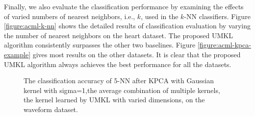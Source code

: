 Finally, we also evaluate the classification performance by examining the effects of varied numbers of nearest neighbors, i.e., $k$, used in the $k$-NN classifiers. Figure \ref{figure:acml-k-nn} shows the detailed results of classification evaluation by varying the number of nearest neighbors on the heart dataset. The proposed UMKL algorithm consistently surpasses the other two baselines. Figure \ref{figure:acml-kpca-example} gives most results on the other datasets. It is clear that the proposed UMKL algorithm always achieves the best performance for all the datasets.


\begin{figure}[!ht]\label{figure:acml-kpca}
\hspace{-0.1in}
\begin{center}
\caption{The classification accuracy of 5-NN after KPCA with Gaussian kernel with sigma=1,the average combination of multiple kernels, the kernel learned by UMKL with varied dimensions, on the waveform dataset.}
\end{center}
\end{figure}

